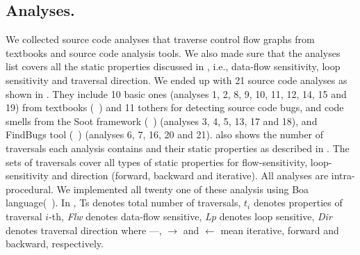 \subsection{Analyses.} We collected source code analyses that traverse control flow 
graphs from textbooks and source code analysis tools. We also made sure that the 
analyses list covers all the static properties discussed in  
, i.e., data-flow sensitivity, loop sensitivity and 
traversal direction. We ended up with 21 source code analyses as shown in 
. They include 10 basic ones (analyses 1, 2, 8, 9, 
10, 11, 12, 14, 15 and 19) from textbooks (~\cite{compilers, programanalysis}) and 11 
tothers for detecting source code bugs, and code smells from the Soot 
framework (~\cite{vallee1999soot}) (analyses 3, 4, 5, 13, 17 and 18), and 
FindBugs tool (~\cite{findbugs-paste2007}) (analyses 6, 7, 16, 20 and 21). 
 also shows the number of traversals each analysis 
contains and their static properties as described in . 
The sets of traversals cover all types of static properties for 
flow-sensitivity, loop-sensitivity and direction (forward, backward and iterative).
All analyses are intra-procedural. We implemented all twenty one of these analysis using Boa language(~\cite{dyer2013boa}). In , Ts denotes total number of traversals, $t_i$ denotes properties of traversal $i$-th, \emph{Flw} denotes data-flow sensitive, \emph{Lp} denotes loop sensitive,
\emph{Dir} denotes traversal direction where ---, $\rightarrow$ and $\leftarrow$ 
mean iterative, forward and backward, respectively.





